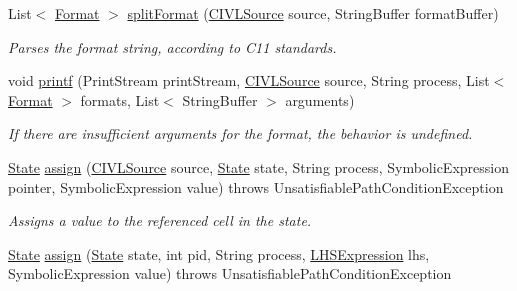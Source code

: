 \begin{DoxyCompactItemize}
\item 
List$<$ \hyperlink{classedu_1_1udel_1_1cis_1_1vsl_1_1civl_1_1semantics_1_1IF_1_1Format}{Format} $>$ \hyperlink{classedu_1_1udel_1_1cis_1_1vsl_1_1civl_1_1semantics_1_1common_1_1CommonExecutor_a21db780b74548ed19da19ba48f2ee35a}{split\+Format} (\hyperlink{interfaceedu_1_1udel_1_1cis_1_1vsl_1_1civl_1_1model_1_1IF_1_1CIVLSource}{C\+I\+V\+L\+Source} source, String\+Buffer format\+Buffer)
\begin{DoxyCompactList}\small\item\em Parses the format string, according to C11 standards. \end{DoxyCompactList}\item 
void \hyperlink{classedu_1_1udel_1_1cis_1_1vsl_1_1civl_1_1semantics_1_1common_1_1CommonExecutor_a07f7046a40790b3f4f82b870956cfcfa}{printf} (Print\+Stream print\+Stream, \hyperlink{interfaceedu_1_1udel_1_1cis_1_1vsl_1_1civl_1_1model_1_1IF_1_1CIVLSource}{C\+I\+V\+L\+Source} source, String process, List$<$ \hyperlink{classedu_1_1udel_1_1cis_1_1vsl_1_1civl_1_1semantics_1_1IF_1_1Format}{Format} $>$ formats, List$<$ String\+Buffer $>$ arguments)
\begin{DoxyCompactList}\small\item\em If there are insufficient arguments for the format, the behavior is undefined. \end{DoxyCompactList}\item 
\hyperlink{interfaceedu_1_1udel_1_1cis_1_1vsl_1_1civl_1_1state_1_1IF_1_1State}{State} \hyperlink{classedu_1_1udel_1_1cis_1_1vsl_1_1civl_1_1semantics_1_1common_1_1CommonExecutor_addd64de526e18405fb9e89b790fa8cba}{assign} (\hyperlink{interfaceedu_1_1udel_1_1cis_1_1vsl_1_1civl_1_1model_1_1IF_1_1CIVLSource}{C\+I\+V\+L\+Source} source, \hyperlink{interfaceedu_1_1udel_1_1cis_1_1vsl_1_1civl_1_1state_1_1IF_1_1State}{State} state, String process, Symbolic\+Expression pointer, Symbolic\+Expression value)  throws Unsatisfiable\+Path\+Condition\+Exception 
\begin{DoxyCompactList}\small\item\em Assigns a value to the referenced cell in the state. \end{DoxyCompactList}\item 
\hyperlink{interfaceedu_1_1udel_1_1cis_1_1vsl_1_1civl_1_1state_1_1IF_1_1State}{State} \hyperlink{classedu_1_1udel_1_1cis_1_1vsl_1_1civl_1_1semantics_1_1common_1_1CommonExecutor_a41f2d8f3b0476d3135960c19a47fa76c}{assign} (\hyperlink{interfaceedu_1_1udel_1_1cis_1_1vsl_1_1civl_1_1state_1_1IF_1_1State}{State} state, int pid, String process, \hyperlink{interfaceedu_1_1udel_1_1cis_1_1vsl_1_1civl_1_1model_1_1IF_1_1expression_1_1LHSExpression}{L\+H\+S\+Expression} lhs, Symbolic\+Expression value)  throws Unsatisfiable\+Path\+Condition\+Exception 

\end{DoxyCompactItemize}
